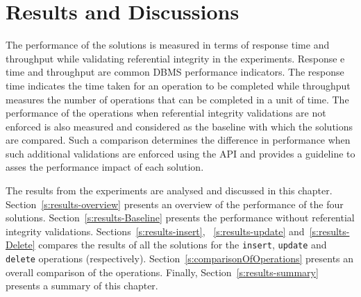 \chapter{Results and Discussions}
 

The performance of the solutions is measured in terms of response time and
throughput while validating referential integrity in the experiments.  Response e
time and throughput are common \ac{DBMS} performance indicators.  The response
time  indicates the time taken for an operation to be completed  while
throughput measures the number of operations that can be  completed in a unit of
time. 
The performance of the operations when referential integrity validations are not
enforced is also measured and considered as the baseline with which the
solutions are compared.   Such a comparison determines the difference in
performance  when such additional validations are enforced using the \ac{API}
and provides a guideline to asses the performance impact of each solution. 

The results from the experiments are analysed and discussed in this chapter. 
Section~\ref{s:results-overview} presents an overview of the  performance of the
four solutions.  
Section~\ref{s:results-Baseline} presents the performance without referential
integrity validations.  
Sections~\ref{s:results-insert},  ~\ref{s:results-update}
and~\ref{s:results-Delete} compares the results
of all the solutions for the \texttt{insert},   \texttt{update} and
\texttt{delete} operations (respectively).   
Section~\ref{s:comparisonOfOperations} presents an overall comparison of the
operations.  
 Finally,   Section~\ref{s:results-summary} presents a summary of this chapter.  

\newcommand{\Width}{0.5\textwidth}
\newcommand{\TB}[1]{\textbf{#1}} 




 




